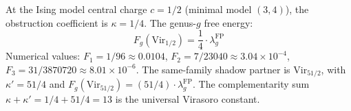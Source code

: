 \begin{computation}[Virasoro at \texorpdfstring{$c = 1/2$}{c = 1/2} (Ising model)]

\label{comp:vir-ising-genera}
At the Ising model central charge $c = 1/2$
(minimal model $(3,4)$), the obstruction coefficient is
$\kappa = 1/4$. The genus-$g$ free energy:
\begin{equation}\label{eq:ising-Fg}
F_g(\mathrm{Vir}_{1/2}) = \frac{1}{4}
\cdot \lambda_g^{\mathrm{FP}}
\end{equation}
Numerical values:
$F_1 = 1/96 \approx 0.0104$,
$F_2 = 7/23040 \approx 3.04 \times 10^{-4}$,
$F_3 = 31/3870720 \approx 8.01 \times 10^{-6}$.
The same-family shadow partner is $\mathrm{Vir}_{51/2}$, with
$\kappa' = 51/4$ and
$F_g(\mathrm{Vir}_{51/2}) = (51/4) \cdot
\lambda_g^{\mathrm{FP}}$. The complementarity sum
$\kappa + \kappa' = 1/4 + 51/4 = 13$ is the universal
Virasoro constant.
\end{computation}

